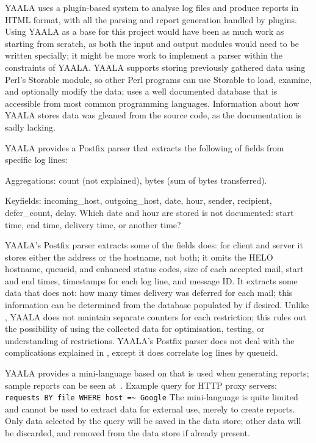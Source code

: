 YAALA uses a plugin-based system to analyse log files and produce reports
in HTML format, with all the parsing and report generation handled by
plugins.  Using YAALA as a base for this project would have been as much
work as starting from scratch, as both the input and output modules would
need to be written specially; it might be more work to implement a parser
within the constraints of YAALA\@.  YAALA supports storing previously
gathered data using Perl's Storable module, so other Perl programs can use
Storable to load, examine, and optionally modify the data; \parsername{}
uses a well documented database that is accessible from most common
programming languages.  Information about how YAALA stores data was gleaned
from the source code, as the documentation is sadly lacking.

YAALA provides a Postfix parser that extracts the following of fields from
specific log lines:

\begin{eqlist}

    \item [Aggregations:] count (not explained), bytes (sum of bytes
        transferred).

    \item [Keyfields:] incoming\_host, outgoing\_host, date, hour, sender,
        recipient, defer\_count, delay.  Which date and hour are stored is
        not documented: start time, end time, delivery time, or another
        time?

\end{eqlist}

\noindent{}YAALA's Postfix parser extracts some of the fields \parsername{}
does: for client and server it stores either the  address or
the hostname, not both; it omits the HELO hostname, queueid, 
and enhanced status codes, size of each accepted mail, start and end times,
timestamps for each log line, and message ID\@.  It extracts some data that
\parsername{} does not: how many times delivery was deferred for each mail;
this information can be determined from the database populated by
\parsername{} if desired.  Unlike \parsername{}, YAALA does not maintain
separate counters for each restriction; this rules out the possibility of
using the collected data for optimisation, testing, or understanding of
restrictions.  YAALA's Postfix parser does not deal with the complications
explained in , except it does correlate log lines
by queueid.

YAALA provides a mini-language based on  that is used when
generating reports; sample reports can be seen
at~.  Example
query for HTTP proxy servers: \newline{} \tab{} \texttt{requests BY file
WHERE host =\~{} Google} \newline{} The mini-language is quite limited and
cannot be used to extract data for external use, merely to create reports.
Only data selected by the query will be saved in the data store; other data
will be discarded, and removed from the data store if already present.

